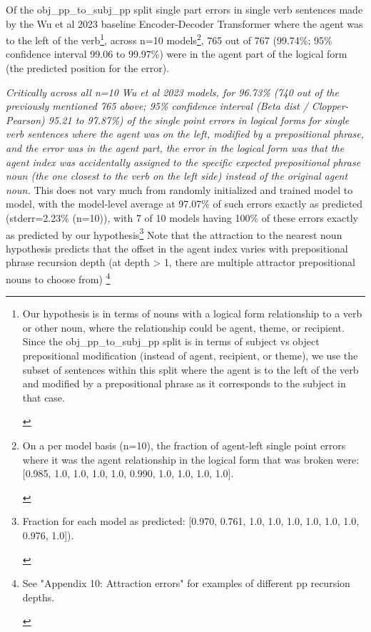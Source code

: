 \documentclass[11pt]{article}
\begin{document}
Of the obj\_pp\_to\_subj\_pp split single part errors in single verb sentences made by the Wu et al 2023 baseline Encoder-Decoder Transformer where the agent was to the left of the verb\footnote{
\begin{tiny}
Our hypothesis is in terms of nouns with a logical form relationship to a verb or other noun, where the relationship could be agent, theme, or recipient.
Since the obj\_pp\_to\_subj\_pp split is in terms of subject vs object prepositional modification (instead of agent, recipient, or theme), we use the subset of sentences within this split where the agent is to the left of the verb and modified by a prepositional phrase as it corresponds to the subject in that case.
\end{tiny}
}, 
across n=10 models\footnote{
\begin{tiny}
On a per model basis (n=10), the fraction of agent-left single point errors where it was the agent relationship in the logical form that was broken were: [0.985, 1.0, 1.0, 1.0, 1.0, 0.990, 1.0, 1.0, 1.0, 1.0].
\end{tiny}
}, 765 out of 767 (99.74\%; 95\% confidence interval 99.06 to 99.97\%) were in the agent part of the logical form (the predicted position for the error).

\textit{Critically across all n=10 Wu et al 2023 models, for 96.73\% (740 out of the previously mentioned 765 above; 95\% confidence interval (Beta dist / Clopper-Pearson) 95.21 to 97.87\%) of the single point errors in logical forms for single verb sentences where the agent was on the left, modified by a prepositional phrase, and the error was in the agent part, the error in the logical form was that the agent index was accidentally assigned to the specific expected prepositional phrase noun (the one closest to the verb on the left side) instead of the original agent noun.}
This does not vary much from randomly initialized and trained model to model, with the model-level average at 97.07\% of such errors exactly as predicted (stderr=2.23\% (n=10)), with 7 of 10 models having 100\% of these errors exactly as predicted by our hypothesis\footnote{
\begin{tiny}
Fraction for each model as predicted: [0.970, 0.761, 1.0, 
1.0, 1.0, 1.0, 1.0, 1.0, 0.976, 1.0]).
\end{tiny}
}
Note that the attraction to the nearest noun hypothesis predicts that the offset in the agent index varies with prepositional phrase recursion depth (at depth > 1, there are multiple attractor prepositional nouns to choose from)
\footnote{
\begin{tiny}
See "Appendix 10: Attraction errors" for examples of different pp recursion depths.
\end{tiny}
}
\end{document}
